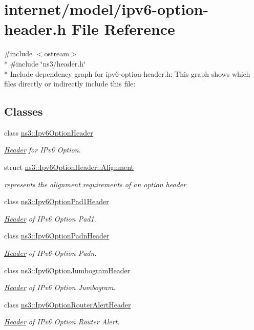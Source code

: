 \hypertarget{ipv6-option-header_8h}{}\section{internet/model/ipv6-\/option-\/header.h File Reference}
\label{ipv6-option-header_8h}
{\ttfamily \#include $<$ostream$>$}\\*
{\ttfamily \#include \char`\"{}ns3/header.\+h\char`\"{}}\\*
Include dependency graph for ipv6-\/option-\/header.h\+:
This graph shows which files directly or indirectly include this file\+:
\subsection*{Classes}
\begin{DoxyCompactItemize}
\item 
class \hyperlink{classns3_1_1Ipv6OptionHeader}{ns3\+::\+Ipv6\+Option\+Header}
\begin{DoxyCompactList}\small\item\em \hyperlink{classns3_1_1Header}{Header} for I\+Pv6 Option. \end{DoxyCompactList}\item 
struct \hyperlink{structns3_1_1Ipv6OptionHeader_1_1Alignment}{ns3\+::\+Ipv6\+Option\+Header\+::\+Alignment}
\begin{DoxyCompactList}\small\item\em represents the alignment requirements of an option header \end{DoxyCompactList}\item 
class \hyperlink{classns3_1_1Ipv6OptionPad1Header}{ns3\+::\+Ipv6\+Option\+Pad1\+Header}
\begin{DoxyCompactList}\small\item\em \hyperlink{classns3_1_1Header}{Header} of I\+Pv6 Option Pad1. \end{DoxyCompactList}\item 
class \hyperlink{classns3_1_1Ipv6OptionPadnHeader}{ns3\+::\+Ipv6\+Option\+Padn\+Header}
\begin{DoxyCompactList}\small\item\em \hyperlink{classns3_1_1Header}{Header} of I\+Pv6 Option Padn. \end{DoxyCompactList}\item 
class \hyperlink{classns3_1_1Ipv6OptionJumbogramHeader}{ns3\+::\+Ipv6\+Option\+Jumbogram\+Header}
\begin{DoxyCompactList}\small\item\em \hyperlink{classns3_1_1Header}{Header} of I\+Pv6 Option Jumbogram. \end{DoxyCompactList}\item 
class \hyperlink{classns3_1_1Ipv6OptionRouterAlertHeader}{ns3\+::\+Ipv6\+Option\+Router\+Alert\+Header}
\begin{DoxyCompactList}\small\item\em \hyperlink{classns3_1_1Header}{Header} of I\+Pv6 Option Router Alert. \end{DoxyCompactList}\end{DoxyCompactItemize}
